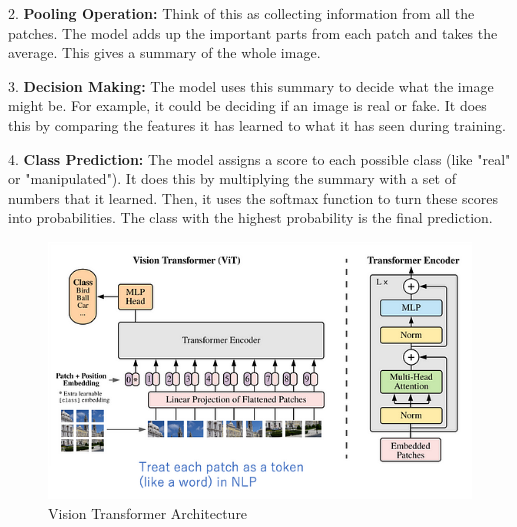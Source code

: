 2. \textbf{Pooling Operation:} Think of this as collecting information from all the patches. The model adds up the important parts from each patch and takes the average. This gives a summary of the whole image.

3. \textbf{Decision Making:} The model uses this summary to decide what the image might be. For example, it could be deciding if an image is real or fake. It does this by comparing the features it has learned to what it has seen during training.

4. \textbf{Class Prediction:} The model assigns a score to each possible class (like "real" or "manipulated"). It does this by multiplying the summary with a set of numbers that it learned. Then, it uses the softmax function to turn these scores into probabilities. The class with the highest probability is the final prediction.


\begin{figure}[htbp]
    \centering
    \includegraphics[width=6in]{img/visiontransformer.png}
    \caption{Vision Transformer Architecture}
\end{figure}

\newpage
